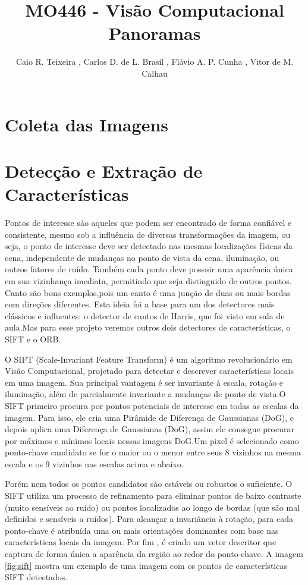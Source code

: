 \documentclass[12pt]{article}
\title{MO446 - Visão Computacional\\Panoramas}
\author{Caio R. Teixeira \inst{1}, Carlos D. de L. Brasil \inst{2}, Flávio A. P. Cunha \inst{1}, Vitor de M. Calhau\inst{3} }
\begin{document}
 

\maketitle

\section{Coleta das Imagens}

\section{Detecção e Extração de Características}
Pontos de interesse são aqueles que podem ser encontrado de forma confiável e consistente, mesmo sob a influência de diversas transformações da imagem, ou seja, o ponto de interesse deve ser detectado nas mesmas localizações físicas da cena, independente de mudanças no ponto de vista da cena, iluminação, ou outros fatores de ruído. Também cada ponto deve possuir uma aparência única em sua vizinhança imediata, permitindo que seja distinguido de outros pontos. Canto são bons exemplos,pois um canto é uma junção de duas ou mais bordas com direções diferentes. Esta ideia foi a base para um dos detectores mais clássicos e influentes: o detector de cantos de Harris, que foi visto em sala de aula.Mas para esse projeto veremos outros dois detectores de características, o SIFT e o ORB.

O SIFT (Scale-Invariant Feature Transform) é um algoritmo revolucionário em Visão Computacional, projetado para detectar e descrever características locais em uma imagem. Sua principal vantagem é ser invariante à escala, rotação e iluminação, além de parcialmente invariante a mudanças de ponto de vista.O SIFT primeiro procura por pontos potenciais de interesse em todas as escalas da imagem. Para isso, ele cria uma Pirâmide de Diferença de Gaussianas (DoG), e depois aplica uma Diferença de Gaussianas (DoG), assim ele consegue  procurar por máximos e mínimos locais  nessas imagens DoG.Um pixel é selecionado como ponto-chave candidato se for o maior ou o menor entre seus 8 vizinhos na mesma escala e os 9 vizinhos nas escalas acima e abaixo.

Porém nem todos os pontos candidatos são estáveis ou robustos o suficiente. O SIFT utiliza um processo de refinamento para eliminar pontos de baixo contraste (muito sensíveis ao ruído) ou pontos localizados ao longo de bordas (que são mal definidos e sensíveis a ruídos). Para alcançar a invariância à rotação, para cada ponto-chave é atribuída uma ou mais orientações dominantes com base nas características locais da imagem. Por fim , é criado um vetor descritor que captura de forma única a aparência da região ao redor do ponto-chave. A imagem \ref{fig:sift} mostra um exemplo de uma imagem com os pontos de características SIFT detectados.
\end{document}
